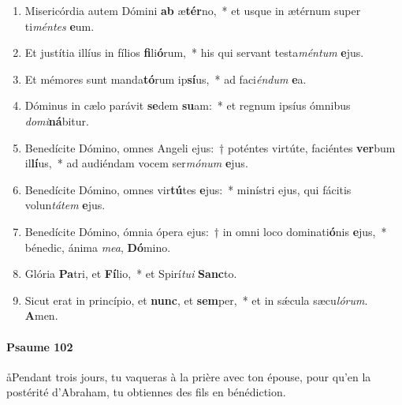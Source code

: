 \documentclass[twoside]{article}
\begin{document}
\begin{paracol}[1]{2}
\begin{enumerate}[wide, itemsep=0mm, labelwidth=!, labelindent=0pt, label=\color{gregoriocolor}\theenumi]
\item Misericórdia autem Dómini \textbf{ab} æ\textbf{tér}no,~* et usque in ætérnum super ti\textit{mén}\textit{tes} \textbf{e}um.
\item Et justítia illíus in fílios \textbf{fi}li\textbf{ó}rum,~* his qui servant testa\textit{mén}\textit{tum} \textbf{e}jus.
\item Et mémores sunt manda\textbf{tó}rum ip\textbf{sí}us,~* ad faci\textit{én}\textit{dum} \textbf{e}a.
\item Dóminus in cælo parávit \textbf{se}dem \textbf{su}am:~* et regnum ipsíus ómnibus \textit{do}\textit{mi}\textbf{ná}bitur.
\item Benedícite Dómino, omnes Angeli ejus:~† poténtes virtúte, faciéntes \textbf{ver}bum il\textbf{lí}us,~* ad audiéndam vocem ser\textit{mó}\textit{num} \textbf{e}jus.
\item Benedícite Dómino, omnes vir\textbf{tú}tes \textbf{e}jus:~* minístri ejus, qui fácitis volun\textit{tá}\textit{tem} \textbf{e}jus.
\item Benedícite Dómino, ómnia ópera ejus:~† in omni loco dominati\textbf{ó}nis \textbf{e}jus,~* bénedic, ánima \textit{me}\textit{a}, \textbf{Dó}mino.
\item Glória \textbf{Pa}tri, et \textbf{Fí}lio,~* et Spirí\textit{tu}\textit{i} \textbf{Sanc}to.
\item Sicut erat in princípio, et \textbf{nunc}, et \textbf{sem}per,~* et in sǽcula sæcu\textit{ló}\textit{rum}. \textbf{A}men.
\end{enumerate}

\switchcolumn

\paragraph{Psaume 102}
\aa Pendant trois jours, tu vaqueras à la prière avec ton épouse, pour qu’en la postérité d’Abraham, tu obtiennes des fils en bénédiction.



\end{paracol}
\end{document}
